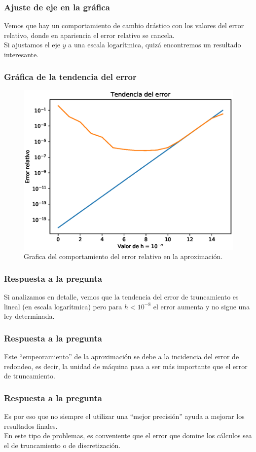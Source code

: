 \begin{frame}[fragile]
\frametitle{Ajuste de eje en la gráfica}
Vemos que hay un comportamiento de cambio drástico con los valores del error relativo, donde en apariencia el error relativo se cancela.
\\
\bigskip
\pause
Si ajustamos el eje $y$ a una escala logarítmica, quizá encontremos un resultado interesante.
\end{frame}
\begin{frame}
\frametitle{Gráfica de la tendencia del error}
\begin{figure}
	\centering
    \includegraphics[scale=0.55]{Imagenes/Ejercicio_Derivada_01.eps}
    \caption{Grafica del comportamiento del error relativo en la aproximación.}
\end{figure}
\end{frame}
\begin{frame}
\frametitle{Respuesta a la pregunta}
Si analizamos en detalle, vemos que la tendencia del error de truncamiento es lineal (en escala logarítmica) pero para $h < 10^{-8}$ el error aumenta y no sigue una ley determinada. 
\end{frame}
\begin{frame}
\frametitle{Respuesta a la pregunta}
Este \enquote{empeoramiento} de la aproximación se debe a la incidencia del error de redondeo, es decir, la unidad de máquina pasa a ser más importante que el error de truncamiento.
\end{frame}
\begin{frame}
\frametitle{Respuesta a la pregunta}
Es por eso que no siempre el utilizar una \enquote{mejor precisión} ayuda a mejorar los resultados finales. 
\\
\bigskip
En este tipo de problemas, es conveniente que el error que domine los cálculos sea el de truncamiento o de discretización.
\end{frame}
